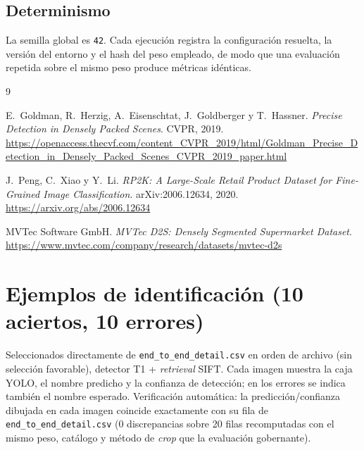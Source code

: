 \documentclass[10pt,a4paper]{article}
\begin{document}
\subsection{Determinismo}

La semilla global es \texttt{42}. Cada ejecución registra la configuración
resuelta, la versión del entorno y el hash del peso empleado, de modo que una
evaluación repetida sobre el mismo peso produce métricas idénticas.

\begin{thebibliography}{9}

E.~Goldman, R.~Herzig, A.~Eisenschtat, J.~Goldberger y T.~Hassner.
\newblock \emph{Precise Detection in Densely Packed Scenes}.
\newblock CVPR, 2019.
\newblock \url{https://openaccess.thecvf.com/content_CVPR_2019/html/Goldman_Precise_Detection_in_Densely_Packed_Scenes_CVPR_2019_paper.html}

J.~Peng, C.~Xiao y Y.~Li.
\newblock \emph{RP2K: A Large-Scale Retail Product Dataset for Fine-Grained Image Classification}.
\newblock arXiv:2006.12634, 2020.
\newblock \url{https://arxiv.org/abs/2006.12634}

MVTec Software GmbH.
\newblock \emph{MVTec D2S: Densely Segmented Supermarket Dataset}.
\newblock \url{https://www.mvtec.com/company/research/datasets/mvtec-d2s}


\end{thebibliography}

\appendix
\section{Ejemplos de identificación (10 aciertos, 10 errores)}
\label{app:ejemplos}

Seleccionados directamente de \texttt{end\_to\_end\_detail.csv} en orden de
archivo (sin selección favorable), detector T1 + \emph{retrieval} SIFT. Cada
imagen muestra la caja YOLO, el nombre predicho y la confianza de detección;
en los errores se indica también el nombre esperado. Verificación automática:
la predicción/confianza dibujada en cada imagen coincide exactamente con su
fila de \texttt{end\_to\_end\_detail.csv} (0 discrepancias sobre 20 filas
recomputadas con el mismo peso, catálogo y método de \emph{crop} que la
evaluación gobernante).
\end{document}
